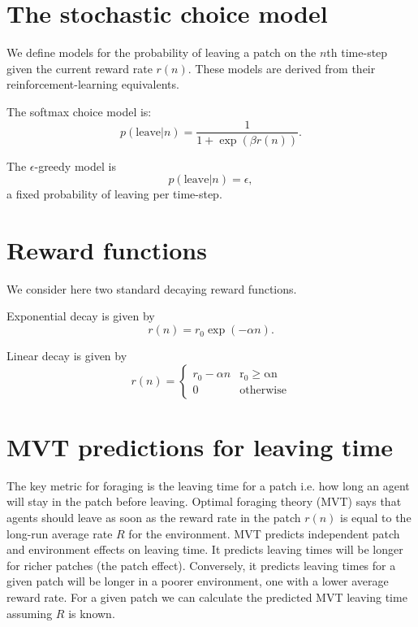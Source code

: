 \documentclass[11pt,a4paper]{article}
\begin{document}
\section{The stochastic choice model} 

We define models for the probability of leaving a patch on the $n$th time-step given the current reward rate $r(n)$. These models are derived from their reinforcement-learning equivalents.

The softmax choice model is:
\begin{equation} \label{eq:softmax}
p(\mathrm{leave}|n) = \frac{1}{1+\exp(\beta r(n))}.
\end{equation}

The $\epsilon$-greedy model is
\begin{equation}\label{eq:epsilon}
p(\mathrm{leave}|n) = \epsilon,
\end{equation}
a fixed probability of leaving per time-step.

\section{Reward functions}
We consider here two standard decaying reward functions.

Exponential decay is given by
\begin{equation} \label{eq:expdecay}
r(n) = r_0\exp(-\alpha n).
\end{equation}

Linear decay is given by 
\begin{equation} \label{eq:lineardecay}
r(n) = \begin{cases} 
r_0 -\alpha n & \mathrm{r_0 \geq \alpha n} \\
0 & \mathrm{otherwise}
\end{cases} 
\end{equation}

\section{MVT predictions for leaving time}
The key metric for foraging is the leaving time for a patch i.e. how long an agent will stay in the patch before leaving. Optimal foraging theory (MVT) says that agents should leave as soon as the reward rate in the patch $r(n)$ is equal to the long-run average rate $R$ for the environment. MVT predicts independent patch and environment effects on leaving time. It predicts leaving times will be longer for richer patches (the patch effect). Conversely, it predicts leaving times for a given patch will be longer in a poorer environment, one with a lower average reward rate. For a given patch we can calculate the predicted MVT leaving time assuming $R$ is known.
\end{document}
